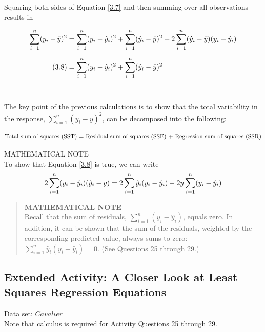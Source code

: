\documentclass[
]{report}
\begin{document}
Squaring both sides of Equation \ref{3.7} and then summing over all observations results in

\begin{align}\label{3.8}
\sum_{i=1}^n (y_i - \bar{y})^2 \notag
  &= \sum_{i=1}^n (y_i - \hat{y}_i)^2
  + \sum_{i=1}^n (\hat{y}_i - \bar{y})^2
  + 2 \sum_{i=1}^n (\hat{y}_i - \bar{y})(y_i - \hat{y}_i) \\[6pt] \tag{3.8}
  &= \sum_{i=1}^n (y_i - \hat{y}_i)^2 + \sum_{i=1}^n (\hat{y}_i - \bar{y})^2 \\[6pt] \notag
\end{align}

The key point of the previous calculations is to show that the total variability in the response, \(\sum_{i=1}^n (y_i - \bar{y})^2\), can be decomposed into the following:

\begin{equation}
\text{Total sum of squares (SST) = Residual sum of squares (SSE) + Regression sum of squares (SSR)} \notag
\end{equation}

MATHEMATICAL NOTE\\
To show that Equation \ref{3.8} is true, we can write
\begin{equation}
2 \sum_{i=1}^n (y_i - \hat{y}_i)(\hat{y}_i - \bar{y})
  = 2 \sum_{i=1}^n \hat{y}_i (y_i - \hat{y}_i)
  - 2 \bar{y} \sum_{i=1}^n (y_i - \hat{y}_i) \notag
\end{equation}

\begin{quote}
\textbf{MATHEMATICAL NOTE}\\
Recall that the sum of residuals, \(\sum_{i=1}^n (y_i - \hat{y}_i)\), equals zero. In addition, it can be shown that the sum of the residuals, weighted by the corresponding predicted value, always sums to zero: \(\sum_{i=1}^n \hat{y}_i (y_i - \hat{y}_i) = 0.\) (See Questions 25 through 29.)
\end{quote}

\subsection*{Extended Activity: A Closer Look at Least Squares Regression Equations}\label{extended-activity-a-closer-look-at-least-squares-regression-equations}

Data set: \(Cavalier\)\\
Note that calculus is required for Activity Questions 25 through 29.
\end{document}
